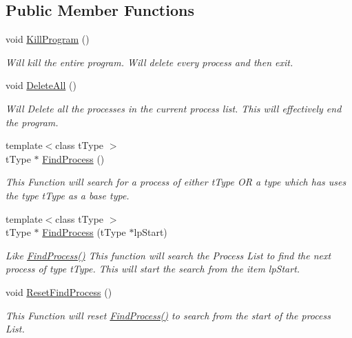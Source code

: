\subsection*{Public Member Functions}
\begin{DoxyCompactItemize}
\item 
\hypertarget{classc_kernel_a721f5ad665c512b511ff8d344010385e}{
void \hyperlink{classc_kernel_a721f5ad665c512b511ff8d344010385e}{KillProgram} ()}
\label{classc_kernel_a721f5ad665c512b511ff8d344010385e}

\begin{DoxyCompactList}\small\item\em Will kill the entire program. Will delete every process and then exit. \end{DoxyCompactList}\item 
\hypertarget{classc_kernel_af4c3e32a55fdef58236378eed46afdfe}{
void \hyperlink{classc_kernel_af4c3e32a55fdef58236378eed46afdfe}{DeleteAll} ()}
\label{classc_kernel_af4c3e32a55fdef58236378eed46afdfe}

\begin{DoxyCompactList}\small\item\em Will Delete all the processes in the current process list. This will effectively end the program. \end{DoxyCompactList}\item 
{\footnotesize template$<$class tType $>$ }\\tType $\ast$ \hyperlink{classc_kernel_a56083c090177a8a2a9bb50ad58e712c3}{FindProcess} ()
\begin{DoxyCompactList}\small\item\em This Function will search for a process of either tType OR a type which has uses the type tType as a base type. \end{DoxyCompactList}\item 
\hypertarget{classc_kernel_a0e6d0700eacd57115a9f6fea1ada3e2a}{
{\footnotesize template$<$class tType $>$ }\\tType $\ast$ \hyperlink{classc_kernel_a0e6d0700eacd57115a9f6fea1ada3e2a}{FindProcess} (tType $\ast$lpStart)}
\label{classc_kernel_a0e6d0700eacd57115a9f6fea1ada3e2a}

\begin{DoxyCompactList}\small\item\em Like \hyperlink{classc_kernel_a56083c090177a8a2a9bb50ad58e712c3}{FindProcess()} This function will search the Process List to find the next process of type tType. This will start the search from the item lpStart. \end{DoxyCompactList}\item 
\hypertarget{classc_kernel_a42d5d224af7acfe4aee27b7cee2b0a02}{
void \hyperlink{classc_kernel_a42d5d224af7acfe4aee27b7cee2b0a02}{ResetFindProcess} ()}
\label{classc_kernel_a42d5d224af7acfe4aee27b7cee2b0a02}

\begin{DoxyCompactList}\small\item\em This Function will reset \hyperlink{classc_kernel_a56083c090177a8a2a9bb50ad58e712c3}{FindProcess()} to search from the start of the process List. \end{DoxyCompactList}\end{DoxyCompactItemize}
